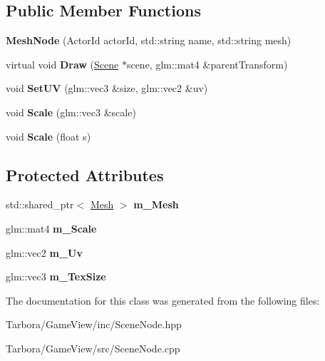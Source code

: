 \subsection*{Public Member Functions}
\begin{DoxyCompactItemize}
\item 
\mbox{\label{classTarbora_1_1MeshNode_ac8707ba03bcbd43176f5d8a01cb8a814}} 
{\bfseries Mesh\+Node} (Actor\+Id actor\+Id, std\+::string name, std\+::string mesh)
\item 
\mbox{\label{classTarbora_1_1MeshNode_af6e0518f98fc972ceac872669c837d77}} 
virtual void {\bfseries Draw} (\hyperlink{classTarbora_1_1Scene}{Scene} $\ast$scene, glm\+::mat4 \&parent\+Transform)
\item 
\mbox{\label{classTarbora_1_1MeshNode_a310d0e5d46197b54bf4f63ea47876ec2}} 
void {\bfseries Set\+UV} (glm\+::vec3 \&size, glm\+::vec2 \&uv)
\item 
\mbox{\label{classTarbora_1_1MeshNode_a6a26713b3770d23ed5228d70910e794d}} 
void {\bfseries Scale} (glm\+::vec3 \&scale)
\item 
\mbox{\label{classTarbora_1_1MeshNode_a82ef441ebd8407dc3c11e0933189a41b}} 
void {\bfseries Scale} (float s)
\end{DoxyCompactItemize}
\subsection*{Protected Attributes}
\begin{DoxyCompactItemize}
\item 
\mbox{\label{classTarbora_1_1MeshNode_a31ccba7c83a72dd07ff7ee06bbc93328}} 
std\+::shared\+\_\+ptr$<$ \hyperlink{classTarbora_1_1Mesh}{Mesh} $>$ {\bfseries m\+\_\+\+Mesh}
\item 
\mbox{\label{classTarbora_1_1MeshNode_a5b8cf7a8a35ebcc8a6047f42ca8d1730}} 
glm\+::mat4 {\bfseries m\+\_\+\+Scale}
\item 
\mbox{\label{classTarbora_1_1MeshNode_ac8b90dda0514d71ffddf36243063203b}} 
glm\+::vec2 {\bfseries m\+\_\+\+Uv}
\item 
\mbox{\label{classTarbora_1_1MeshNode_a8964635446ab4a46e509b07a3de41e0c}} 
glm\+::vec3 {\bfseries m\+\_\+\+Tex\+Size}
\end{DoxyCompactItemize}


The documentation for this class was generated from the following files\+:\begin{DoxyCompactItemize}
\item 
Tarbora/\+Game\+View/inc/Scene\+Node.\+hpp\item 
Tarbora/\+Game\+View/src/Scene\+Node.\+cpp\end{DoxyCompactItemize}
